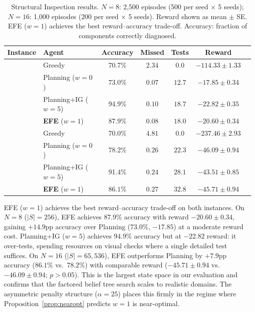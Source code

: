 \documentclass{article}
\begin{document}
\begin{table}[ht]
\centering
\caption{Structural Inspection results. $N{=}8$: 2{,}500 episodes (500 per seed $\times$ 5 seeds); $N{=}16$: 1{,}000 episodes (200 per seed $\times$ 5 seeds). Reward shown as mean $\pm$ SE. EFE ($w{=}1$) achieves the best reward--accuracy trade-off. Accuracy: fraction of components correctly diagnosed.}
\label{tab:inspection}
\begin{small}
\begin{tabular}{llccccc}
\toprule
Instance & Agent & Accuracy & Missed & Tests & Reward \\
\midrule
{} & Greedy & 70.7\% & $2.34$ & $0.0$ & $-114.33 \pm 1.33$ \\
& Planning ($w{=}0$) & 73.0\% & $0.07$ & $12.7$ & $-17.85 \pm 0.34$ \\
& Planning+IG ($w{=}5$) & 94.9\% & $0.10$ & $18.7$ & $-22.82 \pm 0.35$ \\
& \textbf{EFE} ($w{=}1$) & $\mathbf{87.9\%}$ & $\mathbf{0.08}$ & $18.0$ & $\mathbf{-20.60 \pm 0.34}$ \\
\midrule
{} & Greedy & 70.0\% & $4.81$ & $0.0$ & $-237.46 \pm 2.93$ \\
& Planning ($w{=}0$) & 78.2\% & $0.26$ & $22.3$ & $-46.09 \pm 0.94$ \\
& Planning+IG ($w{=}5$) & 91.4\% & $0.24$ & $28.1$ & $-43.51 \pm 0.85$ \\
& \textbf{EFE} ($w{=}1$) & $\mathbf{86.1\%}$ & $\mathbf{0.27}$ & $32.8$ & $\mathbf{-45.71 \pm 0.94}$ \\
\bottomrule
\end{tabular}
\end{small}
\end{table}

EFE ($w{=}1$) achieves the best reward--accuracy trade-off on both instances. On $N{=}8$ ($|S|{=}256$), EFE achieves $87.9\%$ accuracy with reward $-20.60 \pm 0.34$, gaining $+14.9$pp accuracy over Planning ($73.0\%$, $-17.85$) at a moderate reward cost. Planning+IG ($w{=}5$) achieves $94.9\%$ accuracy but at $-22.82$ reward: it over-tests, spending resources on visual checks where a single detailed test suffices. On $N{=}16$ ($|S|{=}65{,}536$), EFE outperforms Planning by $+7.9$pp accuracy ($86.1\%$ vs.\ $78.2\%$) with comparable reward ($-45.71 \pm 0.94$ vs.\ $-46.09 \pm 0.94$; $p > 0.05$). This is the largest state space in our evaluation and confirms that the factored belief tree search scales to realistic domains. The asymmetric penalty structure ($\alpha = 25$) places this firmly in the regime where Proposition~\ref{prop:nearopt} predicts $w{=}1$ is near-optimal.
\end{document}
